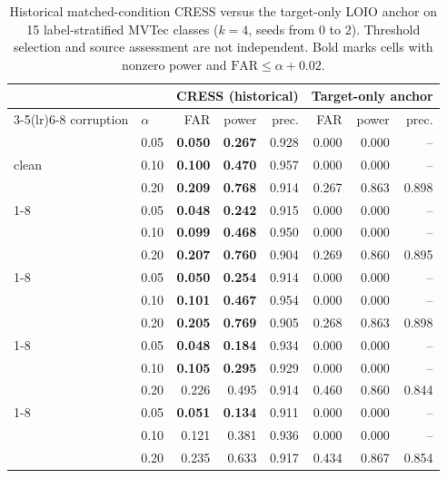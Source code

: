 \begin{table}[pos=t]
\centering
\caption{Historical matched-condition CRESS versus the target-only LOIO anchor on 15 label-stratified MVTec classes ($k{=}4$, seeds from 0 to 2). Threshold selection and source assessment are not independent. Bold marks cells with nonzero power and $\mathrm{FAR}\le\alpha{+}0.02$.}
\label{tab:sc3r-source-validated}
\footnotesize
\setlength{\tabcolsep}{3pt}
\begin{tabular}{llrrrrrr}
\toprule
 & & \multicolumn{3}{c}{CRESS (historical)} & \multicolumn{3}{c}{Target-only anchor} \\
\cmidrule(lr){3-5}\cmidrule(lr){6-8}
corruption & $\alpha$ & FAR & power & prec. & FAR & power & prec. \\
\midrule
\multirow{3}{*}{clean} & 0.05 & \textbf{0.050} & \textbf{0.267} & 0.928 & 0.000 & 0.000 & -- \\
 & 0.10 & \textbf{0.100} & \textbf{0.470} & 0.957 & 0.000 & 0.000 & -- \\
 & 0.20 & \textbf{0.209} & \textbf{0.768} & 0.914 & 0.267 & 0.863 & 0.898 \\
\cmidrule(lr){1-8}
\multirow{3}{*}{blur} & 0.05 & \textbf{0.048} & \textbf{0.242} & 0.915 & 0.000 & 0.000 & -- \\
 & 0.10 & \textbf{0.099} & \textbf{0.468} & 0.950 & 0.000 & 0.000 & -- \\
 & 0.20 & \textbf{0.207} & \textbf{0.760} & 0.904 & 0.269 & 0.860 & 0.895 \\
\cmidrule(lr){1-8}
\multirow{3}{*}{bright/contr.} & 0.05 & \textbf{0.050} & \textbf{0.254} & 0.914 & 0.000 & 0.000 & -- \\
 & 0.10 & \textbf{0.101} & \textbf{0.467} & 0.954 & 0.000 & 0.000 & -- \\
 & 0.20 & \textbf{0.205} & \textbf{0.769} & 0.905 & 0.268 & 0.863 & 0.898 \\
\cmidrule(lr){1-8}
\multirow{3}{*}{Gaussian noise} & 0.05 & \textbf{0.048} & \textbf{0.184} & 0.934 & 0.000 & 0.000 & -- \\
 & 0.10 & \textbf{0.105} & \textbf{0.295} & 0.929 & 0.000 & 0.000 & -- \\
 & 0.20 & 0.226 & 0.495 & 0.914 & 0.460 & 0.860 & 0.844 \\
\cmidrule(lr){1-8}
\multirow{3}{*}{JPEG} & 0.05 & \textbf{0.051} & \textbf{0.134} & 0.911 & 0.000 & 0.000 & -- \\
 & 0.10 & 0.121 & 0.381 & 0.936 & 0.000 & 0.000 & -- \\
 & 0.20 & 0.235 & 0.633 & 0.917 & 0.434 & 0.867 & 0.854 \\
\bottomrule
\end{tabular}
\end{table}
